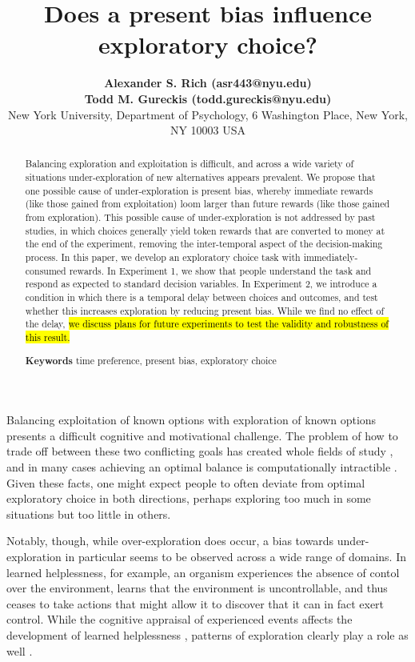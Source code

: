 \documentclass[10pt,letterpaper]{article}
\title{Does a present bias influence exploratory choice?}
\author{  {\large \bf Alexander S. Rich (asr443@nyu.edu)} \\ {\large\bf Todd M. Gureckis (todd.gureckis@nyu.edu)}\\
        New York University, Department of Psychology, 6 Washington Place, New York, NY 10003 USA}
\begin{document}
\maketitle

\begin{abstract}

  Balancing exploration and exploitation is difficult, and across a wide
  variety of situations under-exploration of new alternatives appears prevalent.
  We propose that one possible cause of
  under-exploration is present bias, whereby immediate rewards (like those
  gained from exploitation) loom larger than future rewards (like those
  gained from exploration). This possible cause of under-exploration is not
  addressed by past studies, in which choices generally yield token rewards
  that are converted to money at the end of the experiment, removing the
  inter-temporal aspect of the decision-making process. In this paper, we
  develop an exploratory choice task with immediately-consumed rewards. In
  Experiment 1, we show that people understand the task and respond as expected
  to standard decision variables. In Experiment 2, we introduce a condition in
  which there is a temporal delay between choices and outcomes, and test whether
  this increases exploration by reducing present bias. While we find no effect
  of the delay, \hl{we discuss plans for future experiments to test the validity and
  robustness of this result.}

  \textbf{Keywords} time preference, present bias, exploratory choice
\end{abstract}

Balancing exploitation of known options with exploration of known options
presents a difficult cognitive and motivational challenge. The problem of how to
trade off between these two conflicting goals has created whole fields of study
\citep{Mehlhorn2015, sutton1998reinforcement}, and in many cases achieving an
optimal balance is computationally intractible \citep{Guez2013}. Given these
facts, one might expect people to often deviate from optimal exploratory choice
in both directions, perhaps exploring too much in some situations but too little
in others.

Notably, though, while over-exploration does occur, a bias towards under-exploration in particular seems to be
observed across a wide range of domains. In learned helplessness, for example, an organism
experiences the absence of contol over the environment, learns that the
environment is uncontrollable, and thus ceases to take actions that might allow
it to discover that it can in fact exert control. %
While the cognitive appraisal of experienced events affects the development of
learned helplessness \citep{Abramson1978}, patterns of exploration clearly play
a role as well \citep{Huys2009, Teodorescu2014a}. %
\end{document}
